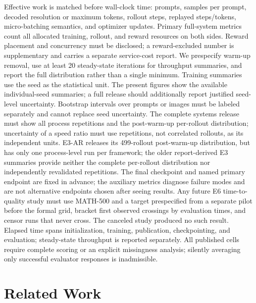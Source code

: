 \documentclass[10pt]{article}
\begin{document}
Effective work is matched before wall-clock time: prompts, samples per prompt, decoded resolution or maximum tokens, rollout steps, replayed steps/tokens, micro-batching semantics, and optimizer updates.
Primary full-system metrics count all allocated training, rollout, and reward resources on both sides. Reward placement and concurrency must be disclosed; a reward-excluded number is supplementary and carries a separate service-cost report.
We prespecify warm-up removal, use at least 20 steady-state iterations for throughput summaries, and report the full distribution rather than a single minimum.
Training summaries use the seed as the statistical unit. The present figures show the available individual-seed summaries; a full release should additionally report justified seed-level uncertainty. Bootstrap intervals over prompts or images must be labeled separately and cannot replace seed uncertainty.
The complete systems release must show all process repetitions and the post-warm-up per-rollout distribution; uncertainty of a speed ratio must use repetitions, not correlated rollouts, as its independent units.
E3-AR releases its 499-rollout post-warm-up distribution, but has only one process-level run per framework; the older report-derived E3 summaries provide neither the complete per-rollout distribution nor independently revalidated repetitions.
The final checkpoint and named primary endpoint are fixed in advance; the auxiliary metrics diagnose failure modes and are not alternative endpoints chosen after seeing results.
Any future E6 time-to-quality study must use MATH-500 and a target prespecified from a separate pilot before the formal grid, bracket first observed crossings by evaluation times, and censor runs that never cross. The canceled study produced no such result.
Elapsed time spans initialization, training, publication, checkpointing, and evaluation; steady-state throughput is reported separately.
All published cells require complete scoring or an explicit missingness analysis; silently averaging only successful evaluator responses is inadmissible.

\section{Related Work}
\label{sec:related}
\end{document}
